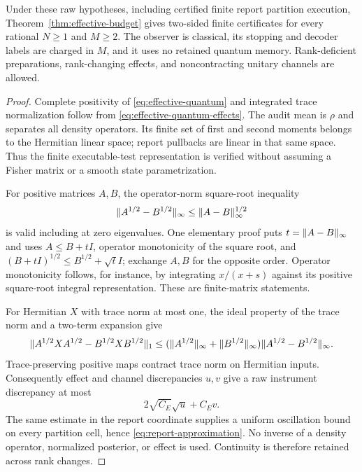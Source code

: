\begin{theorem}\label{thm:effective-quantum}
Under these raw hypotheses, including certified finite report partition execution, Theorem~\ref{thm:effective-budget} gives two-sided finite certificates for every rational $N\ge1$ and $M\ge2$. The observer is classical, its stopping and decoder labels are charged in $M$, and it uses no retained quantum memory. Rank-deficient preparations, rank-changing effects, and noncontracting unitary channels are allowed.
\end{theorem}
\begin{proof}
Complete positivity of \eqref{eq:effective-quantum} and integrated trace normalization follow from \eqref{eq:effective-quantum-effects}. The audit mean is $\rho$ and separates all density operators. Its finite set of first and second moments belongs to the Hermitian linear space; report pullbacks are linear in that same space. Thus the finite executable-test representation is verified without assuming a Fisher matrix or a smooth state parametrization.

For positive matrices $A,B$, the operator-norm square-root inequality
\begin{equation}\label{eq:sqrt-holder}
 \lVert A^{1/2}-B^{1/2}\rVert_\infty\le\lVert A-B\rVert_\infty^{1/2}
\end{equation}
is valid including at zero eigenvalues. One elementary proof puts $t=\lVert A-B\rVert_\infty$ and uses $A\le B+tI$, operator monotonicity of the square root, and $(B+tI)^{1/2}\le B^{1/2}+\sqrt t I$; exchange $A,B$ for the opposite order. Operator monotonicity follows, for instance, by integrating $x/(x+s)$ against its positive square-root integral representation. These are finite-matrix statements.

For Hermitian $X$ with trace norm at most one, the ideal property of the trace norm and a two-term expansion give
\[
 \lVert A^{1/2}XA^{1/2}-B^{1/2}XB^{1/2}\rVert_1
 \le(\lVert A^{1/2}\rVert_\infty+\lVert B^{1/2}\rVert_\infty)
                  \lVert A^{1/2}-B^{1/2}\rVert_\infty.
\]
Trace-preserving positive maps contract trace norm on Hermitian inputs. Consequently effect and channel discrepancies $u,v$ give a raw instrument discrepancy at most
\begin{equation}\label{eq:quantum-raw-modulus}
 2\sqrt{C_E}\sqrt u+C_Ev.
\end{equation}
The same estimate in the report coordinate supplies a uniform oscillation bound on every partition cell, hence \eqref{eq:report-approximation}. No inverse of a density operator, normalized posterior, or effect is used. Continuity is therefore retained across rank changes.


\end{proof}
